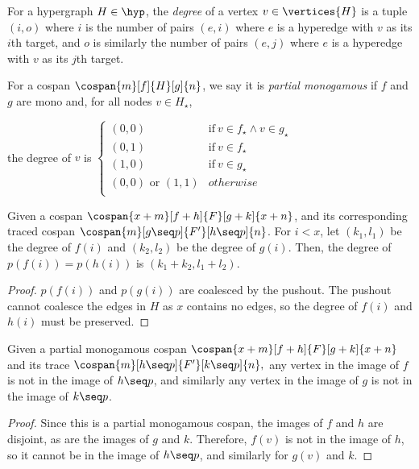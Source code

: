 \begin{definition}
    For a hypergraph \(H \in \hyp\), the \emph{degree} of a vertex \(v \in \vertices{H}\) is a tuple \((i,o)\) where \(i\) is the number of pairs \((e,i)\) where \(e\) is a hyperedge with \(v\) as its \(i\)th target, and \(o\) is similarly the number of pairs \((e,j)\) where \(e\) is a hyperedge with \(v\) as its \(j\)th target.
\end{definition}

\begin{definition}
    For a cospan \(\cospan{m}[f]{H}[g]{n}\), we say it is \emph{partial monogamous} if \(f\) and \(g\) are mono and, for all nodes \(v \in H_\star\),
    \begin{center}
        the degree of \(v\) is $\begin{cases}
            (0,0) & \text{if}\ v \in f_\star \wedge v \in g_\star \\
            (0,1) & \text{if}\ v \in f_\star \\
            (1,0) & \text{if}\ v \in g_\star \\
            (0,0) \text{ or } (1,1) & otherwise \\
        \end{cases}$
    \end{center}
\end{definition}

\begin{lemma}\label{lem:trace-degree}
    Given a cospan \(\cospan{x+m}[f+h]{F}[g+k]{x+n}\), and its corresponding
    traced cospan \(\cospan{m}[g \seq p]{F^\prime}[h \seq p]{n}\).
    For \(i < x\), let \((k_1,l_1)\) be the degree of \(f(i)\) and \((k_2,l_2)\)
    be the degree of \(g(i)\).
    Then, the degree of \(p(f(i)) = p(h(i))\) is \((k_1 + k_2, l_1 + l_2)\).
\end{lemma}
\begin{proof}
    \(p(f(i))\) and \(p(g(i))\) are coalesced by the pushout.
    The pushout cannot coalesce the edges in \(H\) as \(x\) contains no edges,
    so the degree of \(f(i)\) and \(h(i)\) must be preserved.
\end{proof}

\begin{lemma}\label{lem:trace-interface}
    Given a partial monogamous cospan \(\cospan{x+m}[f+h]{F}[g+k]{x+n}\) and its
    trace \(\cospan{m}[h \seq p]{F^\prime}[k \seq p]{n},\) any vertex in the
    image of \(f\) is not in the image of \(h \seq p\), and similarly any vertex
    in the image of \(g\) is not in the image of \(k \seq p\).
\end{lemma}
\begin{proof}
    Since this is a partial monogamous cospan, the images of \(f\) and \(h\) are
    disjoint, as are the images of \(g\) and \(k\).
    Therefore, \(f(v)\) is not in the image of \(h\), so it cannot be in the
    image of \(h \seq p\), and similarly for \(g(v)\) and \(k\).
\end{proof}

